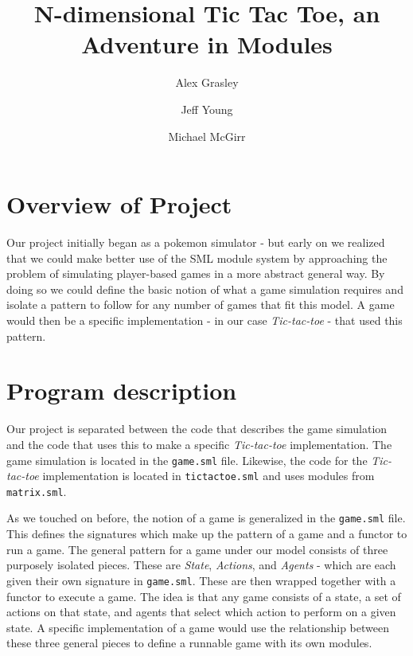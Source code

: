 \documentclass[9pt,letterpaper]{extarticle}
\title{N-dimensional Tic Tac Toe, an Adventure in Modules}
\author{Alex Grasley \and Jeff Young \and Michael McGirr}
\date{}
\begin{document}
	\maketitle

  \section{Overview of Project}

  Our project initially began as a pokemon simulator - but early on we realized
  that we could make better use of the SML module system by approaching the
  problem of simulating player-based games in a more abstract general way.
  By doing so we could define the basic notion of what a game simulation requires
  and isolate a pattern to follow for any number of games that fit this
  model.
  A game would then be a specific implementation - in our case
  \textit{Tic-tac-toe} - that used this pattern.

  \section{Program description}
  
  Our project is separated between the code that describes the game simulation
  and the code that uses this to make a specific \textit{Tic-tac-toe} implementation.
  The game simulation is located in the \texttt{game.sml} file. Likewise, the
  code for the \textit{Tic-tac-toe} implementation is located in
  \texttt{tictactoe.sml} and uses modules from \texttt{matrix.sml}.

  As we touched on before, the notion of a game is generalized in the
  \texttt{game.sml} file. This defines the signatures which make up the pattern
  of a game and a functor to run a game.
  The general pattern for a game under our model consists of three purposely
  isolated pieces.
  These are \textit{State}, \textit{Actions}, and \textit{Agents} - which are
  each given their own signature in \texttt{game.sml}.
  These are then wrapped together with a functor to execute a game.
  The idea is that any game consists of a state, a set of actions on that state,
  and agents that select which action to perform on a given state. A specific implementation of a
  game would use the relationship between these three general pieces to define
  a runnable game with its own modules.
\end{document}

